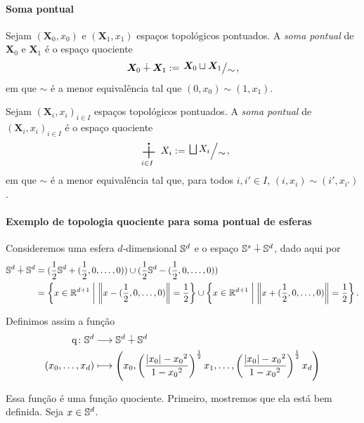 \paragraph{Soma pontual}

\begin{definition}
Sejam $(\bm X_0,x_0)$ e $(\bm X_1,x_1)$ espaços topológicos pontuados. A \emph{soma pontual} de $\bm X_0$ e $\bm X_1$ é o espaço quociente
	\begin{equation*}
	\bm X_0 \dotplus \bm X_1 := \quo{\bm X_0 \sqcup \bm X_1}{\sim},
	\end{equation*}
em que $\sim$ é a menor equivalência tal que $(0,x_0) \sim (1,x_1)$.
\end{definition}

\begin{definition}
Sejam $(\bm X_i,x_i)_{i \in I}$ espaços topológicos pontuados. A \emph{soma pontual} de $(\bm X_i,x_i)_{i \in I}$ é o espaço quociente
	\begin{equation*}
	\bigdotplus_{i \in I} X_i := \quo{\bigsqcup X_i}{\sim},
	\end{equation*}
em que $\sim$ é a menor equivalência tal que, para todos $i,i' \in I$, $(i,x_i) \sim (i',x_{i'})$.
\end{definition}

\paragraph{Exemplo de topologia quociente para soma pontual de esferas}

Consideremos uma esfera $d$-dimensional $\S^d$ e o espaço $\S^s \dotplus \S^d$, dado aqui por
	\begin{align*}
	\S^d \dotplus \S^d &= (\frac{1}{2}\S^d + (\frac{1}{2},0,\ldots,0)) \cup (\frac{1}{2}\S^d - (\frac{1}{2},0,\ldots,0)) \\
		&= \set{x \in \R^{d+1}}{\nor{x-(\frac{1}{2},0,\ldots,0)}=\frac{1}{2}} \cup \set{x \in \R^{d+1}}{\nor{x+(\frac{1}{2},0,\ldots,0)}=\frac{1}{2}}.
	\end{align*}

Definimos assim a função
	\begin{align*}
	\func{\mathrm{q}}{\S^d}{\S^d \dotplus \S^d}{(x_0,\ldots,x_d)}{\left( x_0, \left( \frac{\abs{x_0}-{x_0}^2}{1-{x_0}^2} \right)^{\frac{1}{2}} x_1, \ldots, \left( \frac{\abs{x_0}-{x_0}^2}{1-{x_0}^2} \right)^{\frac{1}{2}} x_d \right)}
	\end{align*}

Essa função é uma função quociente. Primeiro, mostremos que ela está bem definida. Seja $x \in \S^d$.

